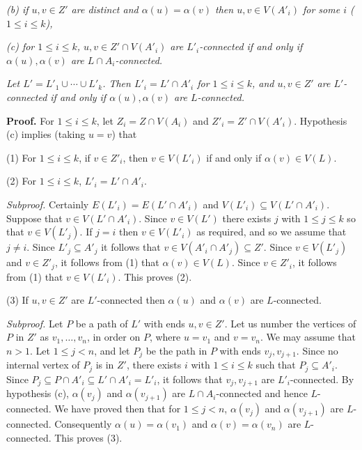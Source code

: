 \textit{(b) if $u, v \in Z'$ are distinct and $\alpha(u) = \alpha(v)$ then $u, v \in V(A'_i)$ for some $i$ ($1 \le i \le k$),}

\textit{(c) for $1 \le i \le k$, $u, v \in Z' \cap V(A'_i)$ are $L'_i$-connected if and only if $\alpha(u), \alpha(v)$ are $L \cap A_i$-connected.}

\textit{Let $L' = L'_1 \cup \cdots \cup L'_k$. Then $L'_i = L' \cap A'_i$ for $1 \le i \le k$, and $u, v \in Z'$ are $L'$-connected if and only if $\alpha(u), \alpha(v)$ are $L$-connected.}

\textbf{Proof.} For $1 \le i \le k$, let $Z_i = Z \cap V(A_i)$ and $Z'_i = Z' \cap V(A'_i)$. Hypothesis (c) implies (taking $u = v$) that

\hspace*{12pt}(1) For $1 \le i \le k$, if $v \in Z'_i$, then $v \in V(L'_i)$ if and only if $\alpha(v) \in V(L)$.

\hspace*{12pt}(2) For $1 \le i \le k$, $L'_i = L' \cap A'_i$.

\textit{Subproof.} Certainly $E(L'_i) = E(L' \cap A'_i)$ and $V(L'_i) \subseteq V(L' \cap A'_i)$. Suppose that $v \in V(L' \cap A'_i)$. Since $v \in V(L')$ there exists $j$ with $1 \le j \le k$ so that $v \in V(L'_j)$. If $j = i$ then $v \in V(L'_i)$ as required, and so we assume that $j \ne i$. Since $L'_j \subseteq A'_j$ it follows that $v \in V(A'_i \cap A'_j) \subseteq Z'$. Since $v \in V(L'_j)$ and $v \in Z'_j$, it follows from (1) that $\alpha(v) \in V(L)$. Since $v \in Z'_i$, it follows from (1) that $v \in V(L'_i)$. This proves (2).

\hspace*{12pt}(3) If $u, v \in Z'$ are $L'$-connected then $\alpha(u)$ and $\alpha(v)$ are $L$-connected.

\textit{Subproof.} Let $P$ be a path of $L'$ with ends $u, v \in Z'$. Let us number the vertices of $P$ in $Z'$ as $v_1, \ldots, v_n$, in order on $P$, where $u = v_1$ and $v = v_n$. We may assume that $n > 1$. Let $1 \le j < n$, and let $P_j$ be the path in $P$ with ends $v_j, v_{j+1}$. Since no internal vertex of $P_j$ is in $Z'$, there exists $i$ with $1 \le i \le k$ such that $P_j \subseteq A'_i$. Since $P_j \subseteq P \cap A'_i \subseteq L' \cap A'_i = L'_i$, it follows that $v_j, v_{j+1}$ are $L'_i$-connected. By hypothesis (c), $\alpha(v_j)$ and $\alpha(v_{j+1})$ are $L \cap A_i$-connected and hence $L$-connected. We have proved then that for $1 \le j < n$, $\alpha(v_j)$ and $\alpha(v_{j+1})$ are $L$-connected. Consequently $\alpha(u) = \alpha(v_1)$ and $\alpha(v) = \alpha(v_n)$ are $L$-connected. This proves (3).

